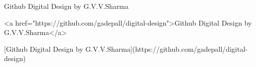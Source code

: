 Github Digital Design by G.V.V.Sharma

<a href="https://github.com/gadepall/digital-design">Github Digital Design by G.V.V.Sharma</a>

[Github Digital Design by G.V.V.Sharma](https://github.com/gadepall/digital-design)
